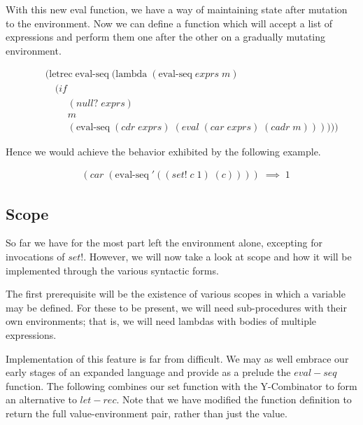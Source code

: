 With this new eval function, we have a way of maintaining state after 
mutation to the environment. Now we can define a function which will accept
a list of expressions and perform them one after the other on a gradually
mutating environment.

\begin{figure}[ht]
\caption{}\label{scheme}
\begin{align*}
& (\text{letrec} \; \text{eval-seq} \; (\text{lambda} \; (\text{eval-seq} \; exprs \; m)
\\& \quad (if
\\& \qquad \; (null? \; exprs)
\\& \qquad \; m
\\& \qquad \; (\text{eval-seq} \; (cdr \; exprs) \; (eval \; (car \; exprs) \; (cadr \; m))))))
\end{align*}
\end{figure}

Hence we would achieve the behavior exhibited by the following
example.

\begin{figure}[ht]
\caption{}\label{scheme}
\begin{align*}
& (car \; (\text{eval-seq} \; '((set! \; c \; 1) \; (c)))) \; \implies \; 1
\end{align*}
\end{figure}

\subsection{Scope}
So far we have for the most part left the environment alone, excepting for
invocations of $set!$. However, we will now take a look at scope and how it
will be implemented through the various syntactic forms.

The first prerequisite will be the existence of various scopes in which a
variable may be defined. For these to be present, we will need sub-procedures
with their own environments; that is, we will need lambdas with bodies of
multiple expressions.

Implementation of this feature is far from difficult. We may as well embrace
our early stages of an expanded language and provide as a prelude the 
$eval-seq$ function. The following combines our set function with the
Y-Combinator to form an alternative to $let-rec$. Note that we have modified
the function definition to return the full value-environment pair, rather 
than just the value.

